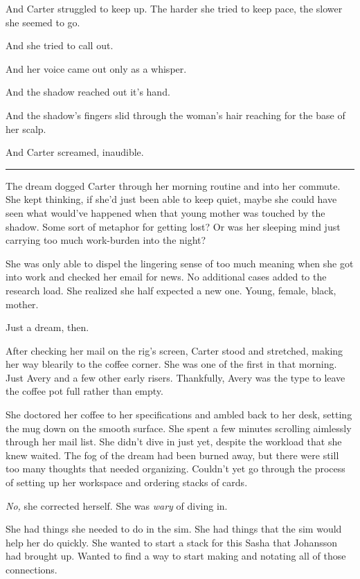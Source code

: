 And Carter struggled to keep up. The harder she tried to keep pace, the slower she seemed to go.

And she tried to call out.

And her voice came out only as a whisper.

And the shadow reached out it's hand.

And the shadow's fingers slid through the woman's hair reaching for the base of her scalp.

And Carter screamed, inaudible.

\vspace{3ex}
\begin{center}\rule{0.5\linewidth}{0.5pt}\end{center}
\vspace{4ex}

The dream dogged Carter through her morning routine and into her commute. She kept thinking, if she'd just been able to keep quiet, maybe she could have seen what would've happened when that young mother was touched by the shadow. Some sort of metaphor for getting lost? Or was her sleeping mind just carrying too much work-burden into the night?

She was only able to dispel the lingering sense of too much meaning when she got into work and checked her email for news. No additional cases added to the research load. She realized she half expected a new one. Young, female, black, mother.

Just a dream, then.

After checking her mail on the rig's screen, Carter stood and stretched, making her way blearily to the coffee corner. She was one of the first in that morning. Just Avery and a few other early risers. Thankfully, Avery was the type to leave the coffee pot full rather than empty.

She doctored her coffee to her specifications and ambled back to her desk, setting the mug down on the smooth surface. She spent a few minutes scrolling aimlessly through her mail list. She didn't dive in just yet, despite the workload that she knew waited. The fog of the dream had been burned away, but there were still too many thoughts that needed organizing. Couldn't yet go through the process of setting up her workspace and ordering stacks of cards.

\emph{No,} she corrected herself. She was \emph{wary} of diving in.

She had things she needed to do in the sim. She had things that the sim would help her do quickly. She wanted to start a stack for this Sasha that Johansson had brought up. Wanted to find a way to start making and notating all of those connections.

